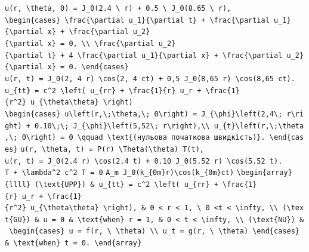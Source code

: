 \documentclass[
  ukrainian,
]{article}
\begin{document}
\texttt{u(r,\ \textbackslash{}theta,\ 0)\ =\ J\_0(2.4\ \textbackslash{}\ r)\ +\ 0.5\ \textbackslash{}\ J\_0(8.65\ \textbackslash{}\ r),}
\texttt{\textbackslash{}begin\{cases\}\ \textbackslash{}frac\{\textbackslash{}partial\ u\_1\}\{\textbackslash{}partial\ t\}\ +\ \textbackslash{}frac\{\textbackslash{}partial\ u\_1\}\{\textbackslash{}partial\ x\}\ +\ \textbackslash{}frac\{\textbackslash{}partial\ u\_2\}\{\textbackslash{}partial\ x\}\ =\ 0,\ \textbackslash{}\textbackslash{}\ \textbackslash{}frac\{\textbackslash{}partial\ u\_2\}\{\textbackslash{}partial\ t\}\ +\ 4\ \textbackslash{}frac\{\textbackslash{}partial\ u\_1\}\{\textbackslash{}partial\ x\}\ +\ \textbackslash{}frac\{\textbackslash{}partial\ u\_2\}\{\textbackslash{}partial\ x\}\ =\ 0.\ \textbackslash{}end\{cases\}}
\texttt{u(r,\ t)\ =\ J\_0(2,\ 4\ r)\ \textbackslash{}cos(2,\ 4\ ct)\ +\ 0,5\ J\_0(8,65\ r)\ \textbackslash{}cos(8,65\ ct).}
\texttt{u\_\{tt\}\ =\ c\^{}2\ \textbackslash{}left(\ u\_\{rr\}\ +\ \textbackslash{}frac\{1\}\{r\}\ u\_r\ +\ \textbackslash{}frac\{1\}\{r\^{}2\}\ u\_\{\textbackslash{}theta\textbackslash{}theta\}\ \textbackslash{}right)}
\texttt{\textbackslash{}begin\{cases\}\ u\textbackslash{}left(r,\textbackslash{};\textbackslash{}theta,\textbackslash{};\ 0\textbackslash{}right)\ =\ J\_\{\textbackslash{}phi\}\textbackslash{}left(2,4\textbackslash{};\ r\textbackslash{}right)\ +\ 0.10\textbackslash{};\textbackslash{};\ J\_\{\textbackslash{}phi\}\textbackslash{}left(5,52\textbackslash{};\ r\textbackslash{}right),\textbackslash{}\textbackslash{}\ u\_\{t\}\textbackslash{}left(r,\textbackslash{};\textbackslash{}theta,\textbackslash{};\ 0\textbackslash{}right)\ =\ 0\ \textbackslash{}qquad\ \textbackslash{}text\{(нульова\ початкова\ швидкість)\}.\ \textbackslash{}end\{cases\}}
\texttt{u(r,\ \textbackslash{}theta,\ t)\ =\ P(r)\ \textbackslash{}Theta(\textbackslash{}theta)\ T(t),}
\texttt{u(r,\ t)\ =\ J\_0(2.4\ r)\ \textbackslash{}cos(2.4\ t)\ +\ 0.10\ J\_0(5.52\ r)\ \textbackslash{}cos(5.52\ t).}
\texttt{T\textquotesingle{}\textquotesingle{}\ +\ \textbackslash{}lambda\^{}2\ c\^{}2\ T\ =\ 0}
\texttt{A\_m\ J\_0(k\_\{0m\}r)\textbackslash{}cos(k\_\{0m\}ct)}
\texttt{\textbackslash{}begin\{array\}\{llll\}\ (\textbackslash{}text\{UPP\})\ \&\ u\_\{tt\}\ =\ c\^{}2\ \textbackslash{}left(\ u\_\{rr\}\ +\ \textbackslash{}frac\{1\}\{r\}\ u\_r\ +\ \textbackslash{}frac\{1\}\{r\^{}2\}\ u\_\{\textbackslash{}theta\textbackslash{}theta\}\ \textbackslash{}right),\ \&\ 0\ \textless{}\ r\ \textless{}\ 1,\ \textbackslash{}\ 0\ \textless{}t\ \textless{}\ \textbackslash{}infty,\ \textbackslash{}\textbackslash{}\ (\textbackslash{}text\{GU\})\ \&\ u\ =\ 0\ \&\ \textbackslash{}text\{when\}\ r\ =\ 1,\ \&\ 0\ \textless{}\ t\ \textless{}\ \textbackslash{}infty,\ \textbackslash{}\textbackslash{}\ (\textbackslash{}text\{NU\})\ \&\ \textbackslash{}begin\{cases\}\ u\ =\ f(r,\ \textbackslash{}\ \textbackslash{}theta)\ \textbackslash{}\textbackslash{}\ u\_t\ =\ g(r,\ \textbackslash{}\ \textbackslash{}theta)\ \textbackslash{}end\{cases\}\ \&\ \textbackslash{}text\{when\}\ t\ =\ 0.\ \textbackslash{}end\{array\}}
\end{document}
